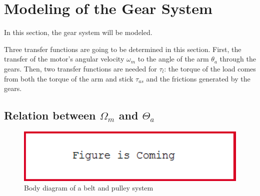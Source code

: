 \graphicspath{{figures/modeling/gearTrain/}}
\section{Modeling of the Gear System}\label{sec:ModGearSys}
In this section, the gear system will be modeled. 



Three transfer functions are going to be determined in this section. First, the transfer of the motor's angular velocity $\omega_m$ to the angle of the arm $\theta_a$ through the gears. Then, two transfer functions are needed for $\tau_l$: the torque of the load comes from both the torque of the arm and stick $\tau_{as}$ and the frictions generated by the gears.


\subsection{Relation between $\Omega_m$ and $\Theta_a$}

\begin{figure}[htbp]
	\centering
	\includegraphics[width=1\textwidth]{figures/FigureIsComing.PNG}
	\caption{Body diagram of a belt and pulley system}
	\label{fig:Belt&Pulley}
\end{figure}

\startexplain
{}
\stopexplain


